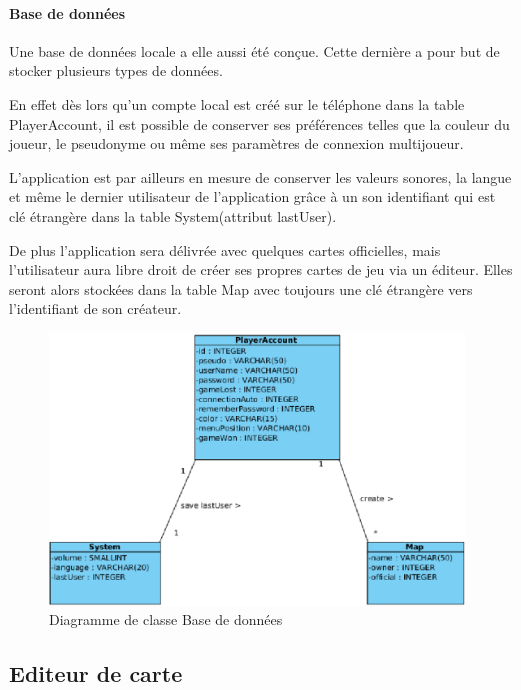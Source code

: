 	\paragraph{Base de données\\}
			
		Une base de données locale a elle aussi été conçue. Cette dernière a pour
		but de stocker plusieurs types de données.
				
		En effet dès lors qu'un compte local est créé sur le téléphone dans la
		table PlayerAccount, il est possible de conserver ses préférences telles 
		que la couleur du joueur, le pseudonyme ou même ses paramètres de connexion multijoueur.
				
		L'application est par ailleurs en mesure de conserver
		les valeurs sonores, la langue et même le dernier utilisateur de
		l'application grâce à un son identifiant qui est clé étrangère dans la table System(attribut lastUser).
				
		De plus l'application sera délivrée avec quelques cartes officielles, mais
		l'utilisateur aura libre droit de créer ses propres cartes de jeu via un
		éditeur. Elles seront alors stockées dans la table Map avec toujours une
		clé étrangère vers l'identifiant de son créateur. \\
		
		\newpage
				
		\begin{figure}
			\includegraphics[width=11cm]{./Analyse/Img/menu_bdd.eps}
			\caption{Diagramme de classe Base de données}
		\end{figure}	
	
\subsection{Editeur de carte}	

